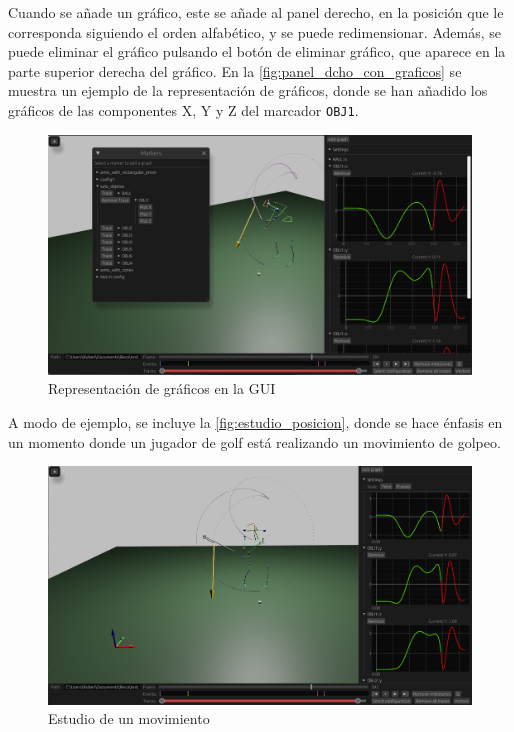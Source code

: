 Cuando se añade un gráfico, este se añade al panel derecho, en la posición que le corresponda siguiendo el orden alfabético, y se puede redimensionar. 
Además, se puede eliminar el gráfico pulsando el botón de eliminar gráfico, que aparece en la parte superior derecha del gráfico. En la \autoref{fig:panel_dcho_con_graficos} se muestra un ejemplo de la representación de gráficos, donde se han añadido los gráficos de las componentes X, Y y Z del marcador \texttt{OBJ1}. 

\begin{figure}[H]
  \centering
  \includegraphics[width=\textwidth]{imagenes/graficos.png}
  \caption{Representación de gráficos en la \ac{GUI}}
  \label{fig:panel_dcho_con_graficos}
\end{figure}

A modo de ejemplo, se incluye la \autoref{fig:estudio_posicion}, donde se hace énfasis en un momento donde un jugador de golf está realizando un movimiento de golpeo.

\begin{figure}[H]
  \centering
  \includegraphics[width=\textwidth]{imagenes/estudio_posicion.png}
  \caption{Estudio de un movimiento}
  \label{fig:estudio_posicion}
\end{figure}


